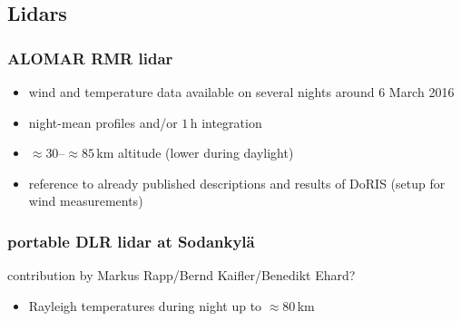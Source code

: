 \subsection{Lidars}

\subsubsection{ALOMAR RMR lidar}
\begin{itemize}
  \item wind and temperature data available on several nights around 6 March 2016
  \item night-mean profiles and/or $1$\,h integration
  \item $\approx 30$--$\approx85$\,km altitude (lower during daylight)
  \medskip
  \item reference to already published descriptions and results of DoRIS (setup for wind measurements)
\end{itemize}

\subsubsection{portable DLR lidar at Sodankyl\"a}
contribution by Markus Rapp/Bernd Kaifler/Benedikt Ehard?

\begin{itemize}
  \item Rayleigh temperatures during night up to $\approx 80$\,km
\end{itemize}